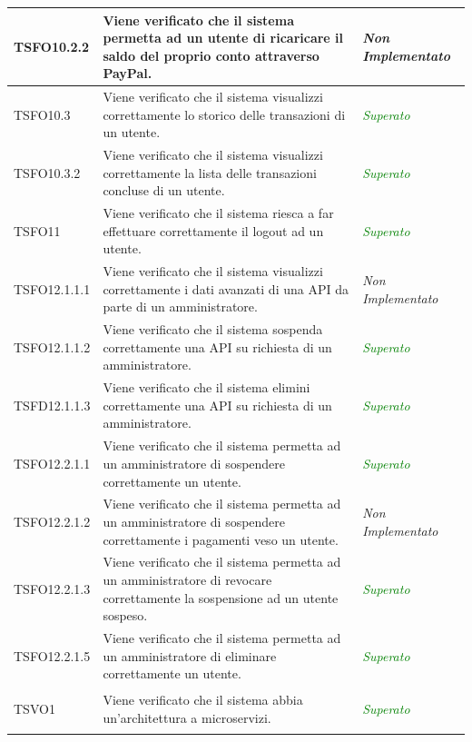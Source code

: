 \begin{longtable}{|>{\centering\arraybackslash}p{2.3cm}|>{\centering\arraybackslash}p{7.5cm} | >{\centering\arraybackslash}p{3.8cm}|}
		\hypertarget{TSFO10.2.2}{TSFO10.2.2} & Viene verificato che il sistema permetta ad un utente di ricaricare il saldo del proprio conto attraverso PayPal. & \textit{Non Implementato}\\ \hline
		\hypertarget{TSFO10.3}{TSFO10.3} & Viene verificato che il sistema visualizzi correttamente lo storico delle transazioni di un utente. & \textcolor{Green}{\textit{Superato}}\\ \hline
		\hypertarget{TSFO10.3.2}{TSFO10.3.2} & Viene verificato che il sistema visualizzi correttamente la lista delle transazioni concluse di un utente. & \textcolor{Green}{\textit{Superato}}\\ \hline
		\hypertarget{TSFO11}{TSFO11} & Viene verificato che il sistema riesca a far effettuare correttamente il logout ad un utente.  & \textcolor{Green}{\textit{Superato}}\\ \hline
		\hypertarget{TSFO12.1.1.1}{TSFO12.1.1.1} & Viene verificato che il sistema visualizzi correttamente i dati avanzati di una API da parte di un amministratore. & \textit{Non Implementato}\\ \hline
		\hypertarget{TSFO12.1.1.2}{TSFO12.1.1.2} & Viene verificato che il sistema sospenda correttamente una API su richiesta di un amministratore. & \textcolor{Green}{\textit{Superato}}\\ \hline
		\hypertarget{TSFD12.1.1.3}{TSFD12.1.1.3} & Viene verificato che il sistema elimini correttamente una API su richiesta di un amministratore. & \textcolor{Green}{\textit{Superato}}\\ \hline
		\hypertarget{TSFO12.2.1.1}{TSFO12.2.1.1} & Viene verificato che il sistema permetta ad un amministratore di sospendere correttamente un utente. & \textcolor{Green}{\textit{Superato}}\\ \hline
		\hypertarget{TSFO12.2.1.2}{TSFO12.2.1.2} & Viene verificato che il sistema permetta ad un amministratore di sospendere correttamente i pagamenti veso un utente. & \textit{Non Implementato}\\ \hline
		\hypertarget{TSFO12.2.1.3}{TSFO12.2.1.3} & Viene verificato che il sistema permetta ad un amministratore di revocare correttamente la sospensione ad un utente sospeso. & \textcolor{Green}{\textit{Superato}}\\ \hline
		\hypertarget{TSFO12.2.1.5}{TSFO12.2.1.5} & Viene verificato che il sistema permetta ad un amministratore di eliminare correttamente un utente. & \textcolor{Green}{\textit{Superato}}\\ \hline		
		\hypertarget{TSVO1}{TSVO1} & Viene verificato che il sistema abbia un'architettura a microservizi. & \textcolor{Green}{\textit{Superato}}\\ \hline

\end{longtable}
